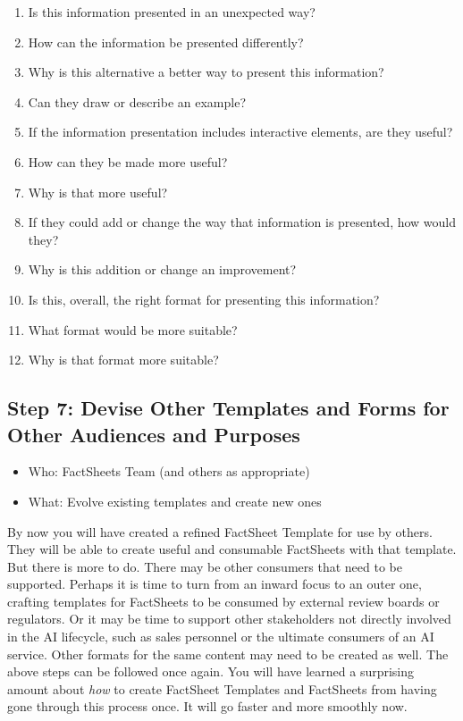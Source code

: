 \documentclass[11pt,dvipdfm]{article}
\begin{document}
\begin{enumerate}
    \item Is this information presented in an unexpected way?
    \item How can the information be presented differently?
    \item Why is this alternative a better way to present this information?
    \item Can they draw or describe an example?
    \item If the information presentation includes interactive elements, are they useful?
    \item How can they be made more useful?
    \item Why is that more useful?
    \item If they could add or change the way that information is presented, how would they?
    \item Why is this addition or change an improvement?
    \item Is this, overall, the right format for presenting this information?
    \item What format would be more suitable?
    \item Why is that format more suitable?
\end{enumerate}

\subsection{Step 7: Devise Other Templates and Forms for Other Audiences and Purposes}

\begin{itemize}[noitemsep,nolistsep]
    \item Who: FactSheets Team (and others as appropriate)
    \item What: Evolve existing templates and create new ones
\end{itemize}
\hspace{.2cm}


By now you will have created a refined FactSheet Template for use by others. They will be able to create useful and consumable FactSheets with that template. But there is more to do. There may be other consumers that need to be supported. Perhaps it is time to turn from an inward focus to an outer one, crafting templates for FactSheets to be consumed by external review boards or regulators. Or it may be time to support other stakeholders not directly involved in the AI lifecycle, such as sales personnel or the ultimate consumers of an AI service. Other formats for the same content may need to be created as well. The above steps can be followed once again. You will have  learned a surprising amount about \textit{how} to create FactSheet Templates and FactSheets from having gone through this process once. It will go faster and more smoothly now.
\end{document}
